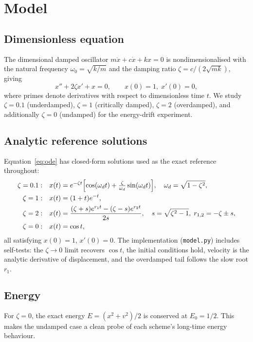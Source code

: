 \documentclass[11pt,a4paper]{article}
\begin{document}
\section{Model}
\subsection{Dimensionless equation}
The dimensional damped oscillator $m\ddot x + c\dot x + kx = 0$ is
nondimensionalised with the natural frequency $\omega_0=\sqrt{k/m}$ and
the damping ratio $\zeta = c/(2\sqrt{mk})$, giving
\begin{equation}
x'' + 2\zeta x' + x = 0, \qquad x(0)=1,\; x'(0)=0,
\label{eq:ode}
\end{equation}
where primes denote derivatives with respect to dimensionless time
$t$. We study $\zeta=0.1$ (underdamped), $\zeta=1$ (critically damped),
$\zeta=2$ (overdamped), and additionally $\zeta=0$ (undamped) for the
energy-drift experiment.

\subsection{Analytic reference solutions}
Equation~\eqref{eq:ode} has closed-form solutions used as the exact
reference throughout:
\begin{align}
\zeta = 0.1:&\quad
x(t) = e^{-\zeta t}\Bigl[\cos(\omega_d t)
      + \tfrac{\zeta}{\omega_d}\sin(\omega_d t)\Bigr],
      \quad \omega_d=\sqrt{1-\zeta^2}, \label{eq:under} \\
\zeta = 1:&\quad x(t) = (1+t)e^{-t}, \\
\zeta = 2:&\quad
x(t) = \frac{(\zeta+s)e^{r_1 t}-(\zeta-s)e^{r_2 t}}{2s},
\quad s=\sqrt{\zeta^2-1},\; r_{1,2}=-\zeta\pm s, \\
\zeta = 0:&\quad x(t) = \cos t,
\end{align}
all satisfying $x(0)=1$, $x'(0)=0$. The implementation
(\texttt{model.py}) includes self-tests: the $\zeta\to0$ limit recovers
$\cos t$, the initial conditions hold, velocity is the analytic
derivative of displacement, and the overdamped tail follows the slow
root $r_1$.

\subsection{Energy}
For $\zeta=0$, the exact energy $E=(x^2+v^2)/2$ is conserved at
$E_0=1/2$. This makes the undamped case a clean probe of each scheme's
long-time energy behaviour.
\end{document}
